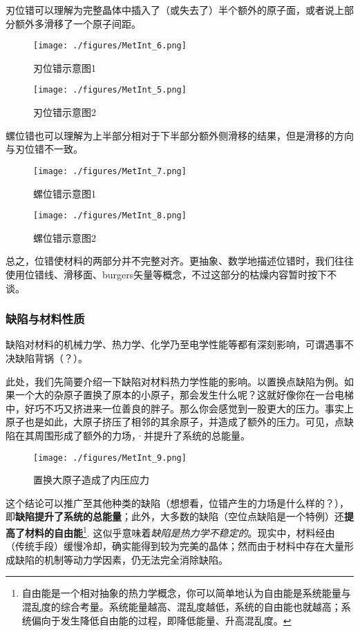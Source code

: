 刃位错可以理解为完整晶体中插入了（或失去了）半个额外的原子面，或者说上部分额外多滑移了一个原子间距。
\begin{figure}[ht]
\centering
\texttt{[image: ./figures/MetInt\_6.png]}
\caption{刃位错示意图1} \label{MetInt_fig6}
\end{figure}
\begin{figure}[ht]
\centering
\texttt{[image: ./figures/MetInt\_5.png]}
\caption{刃位错示意图2} \label{MetInt_fig5}
\end{figure}

螺位错也可以理解为上半部分相对于下半部分额外侧滑移的结果，但是滑移的方向与刃位错不一致。
\begin{figure}[ht]
\centering
\texttt{[image: ./figures/MetInt\_7.png]}
\caption{螺位错示意图1} \label{MetInt_fig7}
\end{figure}
\begin{figure}[ht]
\centering
\texttt{[image: ./figures/MetInt\_8.png]}
\caption{螺位错示意图2} \label{MetInt_fig8}
\end{figure}

总之，位错使材料的两部分并不完整对齐。更抽象、数学地描述位错时，我们往往使用位错线、滑移面、burgers矢量等概念，不过这部分的枯燥内容暂时按下不谈。


\subsubsection{缺陷与材料性质}
缺陷对材料的机械力学、热力学、化学乃至电学性能等都有深刻影响，可谓遇事不决缺陷背锅（？）。

此处，我们先简要介绍一下缺陷对材料热力学性能的影响。以置换点缺陷为例。如果一个大的杂原子置换了原本的小原子，那会发生什么呢？这就好像你在一台电梯中，好巧不巧又挤进来一位善良的胖子。那么你会感觉到一股更大的压力。事实上原子也是如此，大原子挤压了相邻的其余原子，并造成了额外的压力。可见，点缺陷在其周围形成了额外的力场，·并提升了系统的总能量。
\begin{figure}[ht]
\centering
\texttt{[image: ./figures/MetInt\_9.png]}
\caption{置换大原子造成了内压应力} \label{MetInt_fig9}
\end{figure}

这个结论可以推广至其他种类的缺陷（想想看，位错产生的力场是什么样的？），即\textbf{缺陷提升了系统的总能量}；此外，大多数的缺陷（空位点缺陷是一个特例）还\textbf{提高了材料的自由能}\footnote{自由能是一个相对抽象的热力学概念，你可以简单地认为自由能是系统能量与混乱度的综合考量。系统能量越高、混乱度越低，系统的自由能也就越高；系统偏向于发生降低自由能的过程，即降低能量、升高混乱度。}. 这似乎意味着\textsl{缺陷是热力学不稳定的}。现实中，材料经由（传统手段）缓慢冷却，确实能得到较为完美的晶体；然而由于材料中存在大量形成缺陷的机制等动力学因素，仍无法完全消除缺陷。

